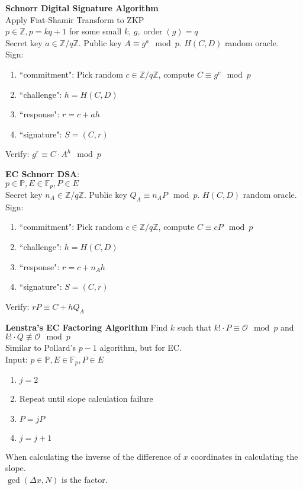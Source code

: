 \documentclass[10pt]{article}
\DeclareMathOperator{\ord}{order}
\begin{document}
\begin{multicols}{2}
    \noindent
    \textbf{Schnorr Digital Signature Algorithm}\\
    Apply Fiat-Shamir Transform to ZKP\\
    $p\in\mathbb{Z},p=kq+1$ for some small $k$, $g,\ord{(g)}=q$\\
    Secret key $a\in\mathbb{Z}/q\mathbb{Z}$. Public key $A\equiv g^a\mod{p}$. $H(C,D)$ random oracle.\\
    Sign:
    \begin{enumerate}
        \item ``commitment": Pick random $c\in\mathbb{Z}/q\mathbb{Z}$, compute $C\equiv g^c\mod{p}$
        \item ``challenge": $h=H(C,D)$
        \item ``response": $r=c+ah$
        \item ``signature": $S=(C,r)$
    \end{enumerate}
    Verify: $g^r\equiv C\cdot A^h\mod{p}$

    \noindent
    \textbf{EC Schnorr DSA}:\\
    $p\in\mathbb{P},E\in\mathbb{F}_p,P\in E$\\
    Secret key $n_A\in\mathbb{Z}/q\mathbb{Z}$. Public key $Q_A\equiv n_AP\mod{p}$. $H(C,D)$ random oracle.\\
    Sign:
    \begin{enumerate}
        \item ``commitment": Pick random $c\in\mathbb{Z}/q\mathbb{Z}$, compute $C\equiv cP\mod{p}$
        \item ``challenge": $h=H(C,D)$
        \item ``response": $r=c+n_Ah$
        \item ``signature": $S=(C,r)$
    \end{enumerate}
    Verify: $rP\equiv C+hQ_A$

    \newcolumn
    \noindent
    \textbf{Lenstra's EC Factoring Algorithm}
    Find $k$ such that $k!\cdot P\equiv \mathcal{O}\mod{p}$ and $k!\cdot Q\not\equiv\mathcal{O}\mod{p}$\\
    Similar to Pollard's $p-1$ algorithm, but for EC.\\
    Input: $p\in\mathbb{P},E\in\mathbb{F}_p,P\in E$
    \begin{enumerate}
        \item $j=2$
        \item Repeat until slope calculation failure
        \item $P=jP$
        \item $j=j+1$
    \end{enumerate}
    When calculating the inverse of the difference of $x$ coordinates in calculating the slope.\\
    $\gcd(\Delta x,N)$ is the factor.



\end{multicols}
\end{document}
